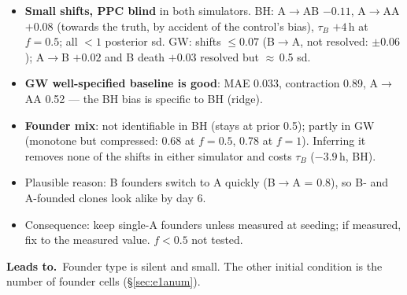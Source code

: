 \documentclass[10pt,a4paper]{article}
\newcommand{\tB}{$\tau_B$}
\newcommand{\Leads}[1]{\begin{leadbox}{\sffamily\bfseries\color{caqua!70!black}Leads to.}\ #1\end{leadbox}}
\newcommand{\sref}[1]{\S\ref{#1}}
\begin{document}
\begin{itemize}
\item \textbf{Small shifts, PPC blind} in both simulators. BH: A$\to$AB $-0.11$, A$\to$AA $+0.08$ (towards the truth, by accident of the control's bias), \tB{} $+4$\,h at $f=0.5$; all $<1$ posterior sd. GW: shifts $\le 0.07$ (B$\to$A, not resolved: $\pm 0.06$); A$\to$B $+0.02$ and B death $+0.03$ resolved but $\approx$\,0.5 sd.
\item \textbf{GW well-specified baseline is good}: MAE 0.033, contraction 0.89, A$\to$AA 0.52 --- the BH bias is specific to BH (ridge).
\item \textbf{Founder mix}: not identifiable in BH (stays at prior 0.5); partly in GW (monotone but compressed: 0.68 at $f=0.5$, 0.78 at $f=1$). Inferring it removes none of the shifts in either simulator and costs \tB{} ($-3.9$\,h, BH).
\item Plausible reason: B founders switch to A quickly (B$\to$A = 0.8), so B- and A-founded clones look alike by day 6.
\item Consequence: keep single-A founders unless measured at seeding; if measured, fix to the measured value. $f<0.5$ not tested.
\end{itemize}
\Leads{Founder type is silent and small. The other initial condition is the number of founder cells (\sref{sec:e1anum}).}
\end{document}
